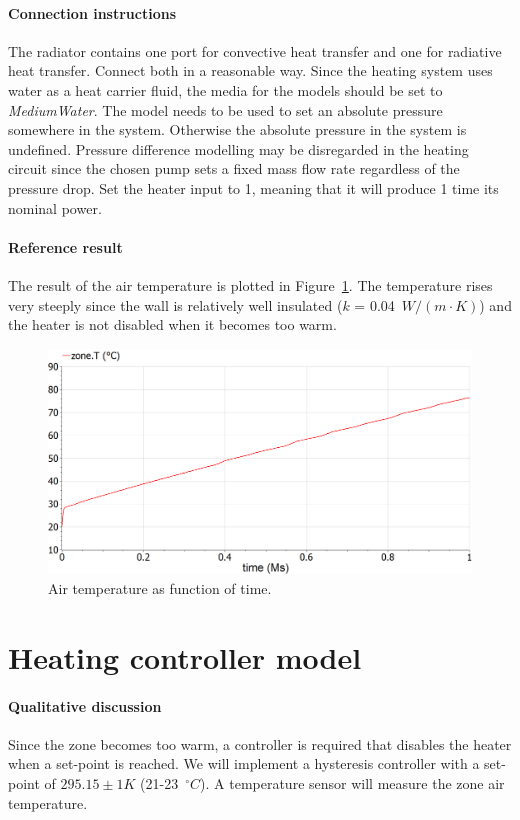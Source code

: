 \documentclass[10pt,a4paper]{article}
\begin{document}
\paragraph{Connection instructions}
The radiator contains one port for convective heat transfer and one for radiative heat transfer. Connect both in a reasonable way. Since the heating system uses water as a heat carrier fluid, the media for the models should be set to \textit{MediumWater}. The  model needs to be used to set an absolute pressure somewhere in the system. Otherwise the absolute pressure in the system is undefined. Pressure difference modelling may be disregarded in the heating circuit since the chosen pump sets a fixed mass flow rate regardless of the pressure drop. Set the heater input to 1, meaning that it will produce 1 time its nominal power.

\paragraph{Reference result}
The result of the air temperature is plotted in Figure~\ref{fig:res4}. The temperature rises very steeply since the wall is relatively well insulated ($k$ = 0.04~$W/(m\cdot K)$) and the heater is not disabled when it becomes too warm.
\begin{figure}[h]
\centering
\includegraphics[width=0.6\columnwidth]{img/result4.png}
\caption{Air temperature as function of time.}
\label{fig:res4}
\end{figure}


\newpage
\section{Heating controller model}
\paragraph{Qualitative discussion}
Since the zone becomes too warm, a controller is required that disables the heater when a set-point is reached. We will implement a hysteresis controller with a set-point of $295.15 \pm 1 K$ (21-23~$^{\circ}C$). A temperature sensor will measure the zone air temperature.
\end{document}
